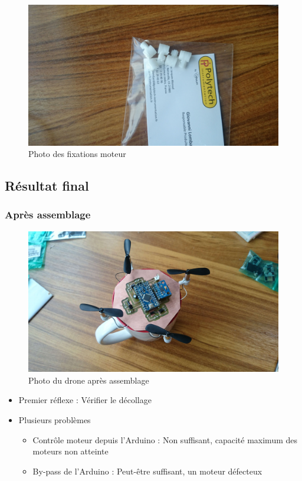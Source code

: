 \documentclass{beamer}
\begin{document}
{\begin{frame}
	  \begin{figure}[htbp]
	    \centering
	    \includegraphics[scale=0.05]{img/fixations.jpg}
	    \caption{Photo des fixations moteur}
	  \end{figure} 
	\end{frame}
      
      \subsection{Résultat final}
	\begin{frame}
	  \frametitle{Après assemblage}
	  
	  \begin{figure}[htbp]
	    \centering
	    \includegraphics[scale=0.05]{img/drone_photo.jpg}
	    \caption{Photo du drone après assemblage}
	  \end{figure} 
	\end{frame}
	
	\begin{frame} %
	  \begin{itemize}
	    \item Premier réflexe : Vérifier le décollage
	    \item Plusieurs problèmes
	    \begin{itemize}
	      \item Contrôle moteur depuis l'Arduino : Non suffisant, capacité maximum des moteurs non atteinte
	      \item By-pass de l'Arduino : Peut-être suffisant, un moteur défecteux
	    \end{itemize}
	  \end{itemize}
	\end{frame}
	
}
\end{document}
